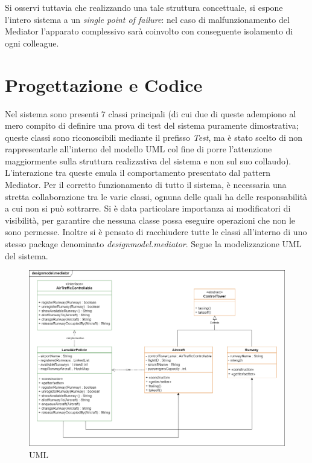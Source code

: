 \documentclass{article}
\begin{document}
\begin{sloppy}
Si osservi tuttavia che realizzando una tale struttura concettuale, si espone l'intero sistema a un \textit{single point of failure}: nel caso di malfunzionamento del Mediator l'apparato complessivo sarà coinvolto con conseguente isolamento di ogni colleague.

\section{Progettazione e Codice}

Nel sistema sono presenti 7 classi principali (di cui due di queste adempiono al mero compito di definire una prova di test del sistema puramente dimostrativa; queste classi sono riconoscibili mediante il prefisso \textit{Test}, ma è stato scelto di non rappresentarle all'interno del modello UML col fine di porre l'attenzione maggiormente sulla struttura realizzativa del sistema e non sul suo collaudo). L'interazione tra queste emula il comportamento presentato dal pattern Mediator. Per il corretto funzionamento di tutto il sistema, è necessaria una stretta collaborazione tra le varie classi, ognuna delle quali ha delle responsabilità a cui non si può sottrarre. Si è data particolare importanza ai modificatori di visibilità, per garantire che nessuna classe possa eseguire operazioni che non le sono permesse. Inoltre si è pensato di racchiudere tutte le classi all'interno di uno stesso package denominato \textit{designmodel.mediator}. Segue la modelizzazione UML del sistema.

\bigbreak
\begin{figure}[H]
    \centering
    \includegraphics[scale=0.275]{figure7.png}
    \caption{UML}
    \label{fig:enter-label}
\end{figure}
\bigbreak



\end{sloppy}
\end{document}

